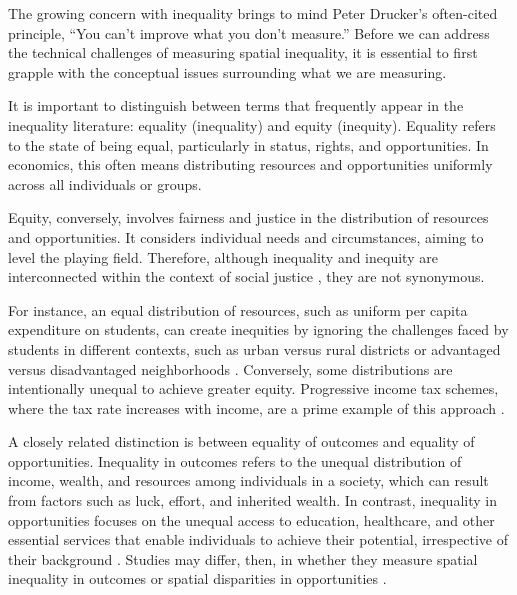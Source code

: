 \documentclass[
  a4paper, 
  twoside,
  final
]{article}
\begin{document}
The growing concern with inequality brings to mind Peter Drucker's
often-cited principle, ``You can't improve what you don't measure.''
Before we can address the technical challenges of measuring spatial
inequality, it is essential to first grapple with the conceptual issues
surrounding what we are measuring.

It is important to distinguish between terms that frequently appear in
the inequality literature: equality (inequality) and equity (inequity).
Equality refers to the state of being equal, particularly in status,
rights, and opportunities. In economics, this often means distributing
resources and opportunities uniformly across all individuals or groups.

Equity, conversely, involves fairness and justice in the distribution of
resources and opportunities. It considers individual needs and
circumstances, aiming to level the playing field. Therefore, although
inequality and inequity are interconnected within the context of social
justice \citep{sen2004InequalityReexamined}, they are not synonymous.

For instance, an equal distribution of resources, such as uniform per
capita expenditure on students, can create inequities by ignoring the
challenges faced by students in different contexts, such as urban versus
rural districts or advantaged versus disadvantaged neighborhoods
\citep{tine2017GrowingRural}. Conversely, some distributions are
intentionally unequal to achieve greater equity. Progressive income tax
schemes, where the tax rate increases with income, are a prime example
of this approach \citep{ledic2023TaxProgressivity}.

A closely related distinction is between equality of outcomes and
equality of opportunities. Inequality in outcomes refers to the unequal
distribution of income, wealth, and resources among individuals in a
society, which can result from factors such as luck, effort, and
inherited wealth. In contrast, inequality in opportunities focuses on
the unequal access to education, healthcare, and other essential
services that enable individuals to achieve their potential,
irrespective of their background \citep{roemer1998EqualityOpportunity}.
Studies may differ, then, in whether they measure spatial inequality in
outcomes \citep{khedmatimorasae2024SocialDeterminants} or spatial
disparities in opportunities \citep{knaap2017CartographyOpportunity}.
\end{document}

